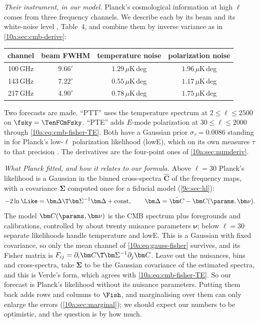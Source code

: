 \emph{Their instrument, in our model.} Planck's cosmological information at high $\ell$ comes from three frequency
channels. We describe each by its beam and its white-noise level \cite{Planck2018I}, Table~4, and combine them by
inverse variance as in \cref{10a:sec:cmb-derive}:
\begin{center}
\small
\renewcommand{\arraystretch}{1.15}
\begin{tabular}{@{}cccc@{}}
\toprule
channel & beam FWHM & temperature noise & polarization noise\\\midrule
100\,GHz & $9.66'$ & $1.29\,\mu$K\,deg & $1.96\,\mu$K\,deg\\
143\,GHz & $7.22'$ & $0.55\,\mu$K\,deg & $1.17\,\mu$K\,deg\\
217\,GHz & $4.90'$ & $0.78\,\mu$K\,deg & $1.75\,\mu$K\,deg\\
\bottomrule
\end{tabular}
\end{center}
Two forecasts are made. ``PTT'' uses the temperature spectrum at $2\le\ell\le2500$ on $\fsky=\TenFCmFsky$. ``PTE'' adds
$E$-mode polarization at $30\le\ell\le2000$ through \eqref{10a:eq:cmb-fisher-TE}. Both have a Gaussian prior
$\sigma_\tau=0.0086$ standing in for Planck's low-$\ell$ polarization likelihood (lowE), which on its own measures $\tau$
to that precision \cite{Planck2018VI}. The derivatives are the four-point ones of \cref{10a:sec:numderiv}.

\emph{What Planck fitted, and how it relates to our formula.} Above $\ell=30$ Planck's likelihood is a Gaussian in
the binned cross-spectra $\hat{\bm C}$ of the frequency maps, with a covariance $\bm\Sigma$ computed once for a fiducial
model (\cref{9c:sec:hl}):
\[
  -2\ln\Like=\bm\Delta\T\bm\Sigma^{-1}\bm\Delta+\text{const},\qquad \bm\Delta=\hat{\bm C}-\bm C(\params,\bm\nu).
\]
The model $\bm C(\params,\bm\nu)$ is the CMB spectrum plus foregrounds and calibrations, controlled by about twenty
nuisance parameters $\bm\nu$; below $\ell=30$ separate likelihoods handle temperature and lowE. This is a Gaussian
with fixed covariance, so only the mean channel of \eqref{10a:eq:gauss-fisher} survives, and its Fisher matrix is
$F_{ij}=\partial_i\bm C\T\bm\Sigma^{-1}\partial_j\bm C$. Leave out the nuisances, bins and cross-spectra, take $\bm\Sigma$ to be the Gaussian
covariance of the estimated spectra, and this is Verde's form, which agrees with \eqref{10a:eq:cmb-fisher-TE}.
So our forecast is Planck's likelihood without its nuisance parameters. Putting them back adds rows and
columns to $\Fish$, and marginalising over them can only enlarge the errors (\cref{10a:sec:marginal}); we should
expect our numbers to be optimistic, and the question is by how much.

